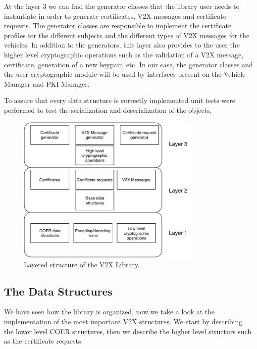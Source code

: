 At the layer 3 we can find the generator classes that the library user needs to instantiate in order to generate certificates, V2X messages and certificate requests. The generator classes are responsible to implement the certificate profiles for the different subjects and the different types of V2X messages for the vehicles. In addition to the generators, this layer also provides to the user the higher level cryptographic operations such as the validation of a V2X message, certificate, generation of a new keypair, etc. In our case, the generator classes and the user cryptographic module will be used by interfaces present on the Vehicle Manager and PKI Manager. 

To assure that every data structure is correctly implemented unit tests were performed to test the serialization and deserialization of the objects.

\begin{figure}
	\centering
	\includegraphics[width=0.8\textwidth]{Figures/v2xlib}
	\caption{\label{fig:v2x_arch} Layered structure of the V2X Library.}
\end{figure}

\subsection{The Data Structures}
We have seen how the library is organized, now we take a look at the implementation of the most important V2X structures. We start by describing the lower level COER structures, then we describe the higher level structurs such as the certificate requests.


